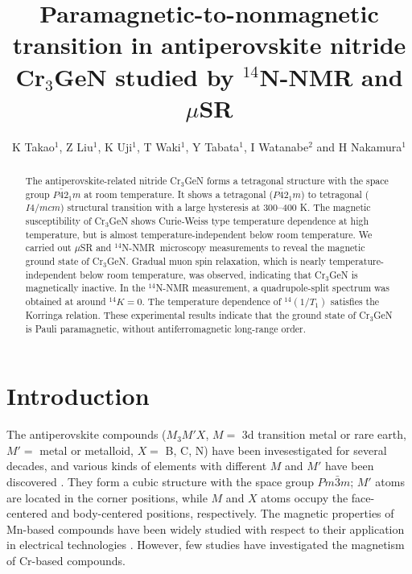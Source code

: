 \documentclass[a4paper]{jpconf}
\newcommand{\NitNMR}{$^{14}$N-NMR\ }
\begin{document}
\title{Paramagnetic-to-nonmagnetic transition in antiperovskite nitride Cr$_3$GeN studied by $^{14}$N-NMR and $\mu$SR}

\author{K Takao$^1$, Z Liu$^1$, K Uji$^1$, T Waki$^1$, Y Tabata$^1$, I Watanabe$^2$ and H Nakamura$^1$}

\address{$^1$ Department of Materials Science and Engineering, %
 Kyoto University, Kyoto 606-8501, Japan\\
$^2$ Advanced Meson Science Laboratory, RIKEN Nishina Center, 
Wako 351-0198, Japan}


\begin{abstract}
The antiperovskite-related nitride Cr$_3$GeN forms a tetragonal structure with the space group $P\bar{4}2_1m$ at room temperature. It shows a tetragonal ($P\bar{4}2_1m$) to tetragonal ($I4/mcm$) structural transition with a large hysteresis at 300--400 K. 
The magnetic susceptibility of Cr$_3$GeN shows Curie-Weiss type temperature dependence at high temperature, but is almost temperature-independent below room temperature. 
We carried out $\mu$SR and \NitNMR microscopy measurements to reveal the magnetic ground state of Cr$_3$GeN. 
Gradual muon spin relaxation, which is nearly temperature-independent below room temperature, was observed, indicating that Cr$_3$GeN is magnetically inactive.
In the $^{14}$N-NMR measurement, a quadrupole-split spectrum was obtained at around $^{14}K = 0$. 
The temperature dependence of $^{14}(1/T_1)$ satisfies the Korringa relation.
These experimental results indicate that the ground state of Cr$_3$GeN is Pauli paramagnetic, without antiferromagnetic long-range order. 
\end{abstract}

\section{Introduction}
The antiperovskite compounds ($M_3M'X$, $M = $ 3d transition metal or rare earth, $M' = $ metal or metalloid, $X = $ B, C, N) have been invesestigated for several decades, and various kinds of elements with different $M$ and $M'$ have been discovered \cite{Boller1, Nardin1, Boller2, Jeitschko1, Samson1, Haschke1}.
They form a cubic structure with the space group $Pm\bar{3}m$; $M'$ atoms are located in the corner positions, while $M$ and $X$ atoms occupy the face-centered and body-centered positions, respectively.
The magnetic properties of Mn-based compounds have been widely studied with respect to their application in electrical technologies \cite{Kodama1, Kamishima1, Takenaka1}.
However, few studies have investigated the magnetism of Cr-based compounds.
\end{document}
